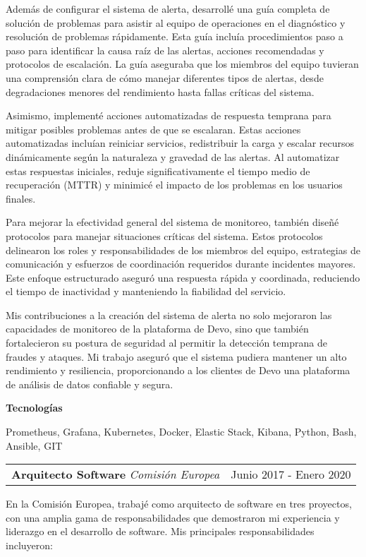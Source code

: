 \documentclass[a4paper,10pt]{article}
\makeatletter
\newcommand{\cvsubsection}[3]{
  \begin{tcolorbox}[colback=gray!20, colframe=gray!20, boxrule=0pt, arc=0mm, outer arc=0mm, width=\dimexpr\textwidth-2mm\relax, boxsep=0pt, left=2mm, right=2mm, top=2mm, bottom=2mm]
    \begin{tabular*}{\dimexpr\textwidth-6mm\relax}{p{0.7\textwidth} @{\extracolsep{\fill}} p{0.3\textwidth}}
      \raggedright
      \textbf{#1} \textit{#2} & \raggedleft \small{#3}
    \end{tabular*}
  \end{tcolorbox}
  \vspace{2mm}
}
\newcommand{\cvsubsubsubsection}[1]{
  \begin{tcolorbox}[colback=gray!5, colframe=gray!5, boxrule=0pt, arc=0mm, outer arc=0mm, width=\textwidth, boxsep=0pt, left=6mm, right=6mm, top=1mm, bottom=1mm]
    \textbf{#1}
  \end{tcolorbox}
  \vspace{1mm}
}
\makeatother
\begin{document}
Además de configurar el sistema de alerta, desarrollé una guía completa de solución de problemas para asistir al equipo de operaciones en el diagnóstico y resolución de problemas rápidamente. Esta guía incluía procedimientos paso a paso para identificar la causa raíz de las alertas, acciones recomendadas y protocolos de escalación. La guía aseguraba que los miembros del equipo tuvieran una comprensión clara de cómo manejar diferentes tipos de alertas, desde degradaciones menores del rendimiento hasta fallas críticas del sistema.

Asimismo, implementé acciones automatizadas de respuesta temprana para mitigar posibles problemas antes de que se escalaran. Estas acciones automatizadas incluían reiniciar servicios, redistribuir la carga y escalar recursos dinámicamente según la naturaleza y gravedad de las alertas. Al automatizar estas respuestas iniciales, reduje significativamente el tiempo medio de recuperación (MTTR) y minimicé el impacto de los problemas en los usuarios finales.

Para mejorar la efectividad general del sistema de monitoreo, también diseñé protocolos para manejar situaciones críticas del sistema. Estos protocolos delinearon los roles y responsabilidades de los miembros del equipo, estrategias de comunicación y esfuerzos de coordinación requeridos durante incidentes mayores. Este enfoque estructurado aseguró una respuesta rápida y coordinada, reduciendo el tiempo de inactividad y manteniendo la fiabilidad del servicio.

Mis contribuciones a la creación del sistema de alerta no solo mejoraron las capacidades de monitoreo de la plataforma de Devo, sino que también fortalecieron su postura de seguridad al permitir la detección temprana de fraudes y ataques. Mi trabajo aseguró que el sistema pudiera mantener un alto rendimiento y resiliencia, proporcionando a los clientes de Devo una plataforma de análisis de datos confiable y segura.

\cvsubsubsubsection{Tecnologías}
Prometheus, Grafana, Kubernetes, Docker, Elastic Stack, Kibana, Python, Bash, Ansible, GIT

\cvsubsection{Arquitecto Software}{Comisión Europea}{Junio 2017 - Enero 2020}
En la Comisión Europea, trabajé como arquitecto de software en tres proyectos, con una amplia gama de responsabilidades que demostraron mi experiencia y liderazgo en el desarrollo de software. Mis principales responsabilidades incluyeron:
\end{document}
